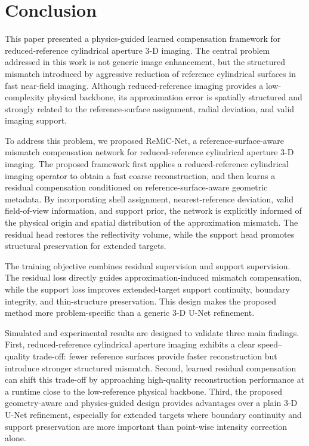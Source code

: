 \documentclass[journal]{IEEEtran}
\begin{document}
\section{Conclusion}
\label{sec:conclusion}

This paper presented a physics-guided learned compensation framework for reduced-reference cylindrical aperture 3-D imaging. The central problem addressed in this work is not generic image enhancement, but the structured mismatch introduced by aggressive reduction of reference cylindrical surfaces in fast near-field imaging. Although reduced-reference imaging provides a low-complexity physical backbone, its approximation error is spatially structured and strongly related to the reference-surface assignment, radial deviation, and valid imaging support.

To address this problem, we proposed ReMiC-Net, a reference-surface-aware mismatch compensation network for reduced-reference cylindrical aperture 3-D imaging. The proposed framework first applies a reduced-reference cylindrical imaging operator to obtain a fast coarse reconstruction, and then learns a residual compensation conditioned on reference-surface-aware geometric metadata. By incorporating shell assignment, nearest-reference deviation, valid field-of-view information, and support prior, the network is explicitly informed of the physical origin and spatial distribution of the approximation mismatch. The residual head restores the reflectivity volume, while the support head promotes structural preservation for extended targets.

The training objective combines residual supervision and support supervision. The residual loss directly guides approximation-induced mismatch compensation, while the support loss improves extended-target support continuity, boundary integrity, and thin-structure preservation. This design makes the proposed method more problem-specific than a generic 3-D U-Net refinement.

Simulated and experimental results are designed to validate three main findings. First, reduced-reference cylindrical aperture imaging exhibits a clear speed--quality trade-off: fewer reference surfaces provide faster reconstruction but introduce stronger structured mismatch. Second, learned residual compensation can shift this trade-off by approaching high-quality reconstruction performance at a runtime close to the low-reference physical backbone. Third, the proposed geometry-aware and physics-guided design provides advantages over a plain 3-D U-Net refinement, especially for extended targets where boundary continuity and support preservation are more important than point-wise intensity correction alone.
\end{document}
